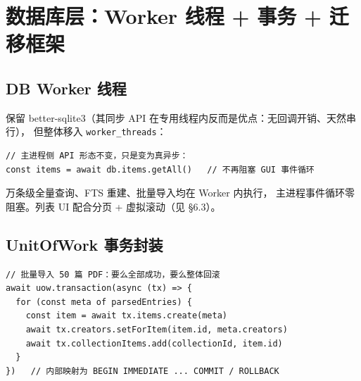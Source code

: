 \documentclass[12pt, a4paper]{article}
\begin{document}
\section{数据库层：Worker 线程 + 事务 + 迁移框架}

\subsection{DB Worker 线程}

保留 better-sqlite3（其同步 API 在专用线程内反而是优点：无回调开销、天然串行），
但整体移入 \texttt{worker\_threads}：

\begin{center}
\end{center}

\begin{lstlisting}[language={}]
// 主进程侧 API 形态不变，只是变为真异步：
const items = await db.items.getAll()   // 不再阻塞 GUI 事件循环
\end{lstlisting}

\begin{tcolorbox}[fixbox, title={对策 \#4：解决「同步 SQL 阻塞主进程」}]
  万条级全量查询、FTS 重建、批量导入均在 Worker 内执行，
  主进程事件循环零阻塞。列表 UI 配合分页 + 虚拟滚动（见 \S6.3）。
\end{tcolorbox}

\subsection{UnitOfWork 事务封装}

\begin{lstlisting}[language={}]
// 批量导入 50 篇 PDF：要么全部成功，要么整体回滚
await uow.transaction(async (tx) => {
  for (const meta of parsedEntries) {
    const item = await tx.items.create(meta)
    await tx.creators.setForItem(item.id, meta.creators)
    await tx.collectionItems.add(collectionId, item.id)
  }
})   // 内部映射为 BEGIN IMMEDIATE ... COMMIT / ROLLBACK
\end{lstlisting}
\end{document}
